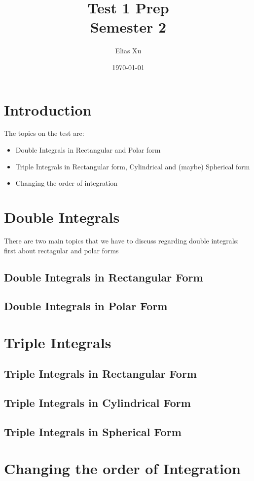 \documentclass{article}
\begin{document}
\title{Test 1 Prep \\
    \large{Semester 2}}
\author{Elias Xu}
\date{\today}
\maketitle

\tableofcontents

\setlength{\parindent}{0pt}

\section{Introduction}

The topics on the test are: 
\begin{itemize}
    \item Double Integrals in Rectangular and Polar form
    \item Triple Integrals in Rectangular form, Cylindrical and (maybe) Spherical form
    \item Changing the order of integration
\end{itemize}

\section{Double Integrals}

There are two main topics that we have to discuss regarding double integrals: first about rectagular and polar forms

\subsection{Double Integrals in Rectangular Form}

\subsection{Double Integrals in Polar Form}

\section{Triple Integrals}

\subsection{Triple Integrals in Rectangular Form}

\subsection{Triple Integrals in Cylindrical Form}

\subsection{Triple Integrals in Spherical Form}


\section{Changing the order of Integration}
\end{document}
